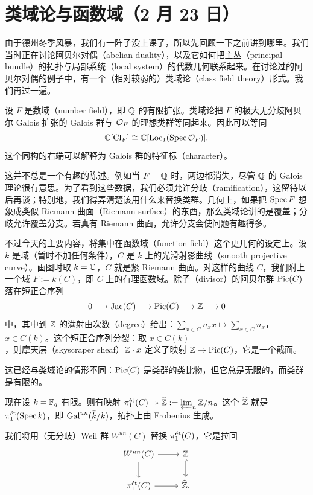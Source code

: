 \section[类域论与函数域]{类域论与函数域（2 月 23 日）}


由于德州冬季风暴，我们有一阵子没上课了，所以先回顾一下之前讲到哪里。我们当时正在讨论阿贝尔对偶（abelian duality），以及它如何把主丛（principal bundle）的拓扑与局部系统（local system）的代数几何联系起来。在讨论过的阿贝尔对偶的例子中，有一个（相对较弱的）类域论（class field theory）形式。我们再过一遍。

设 $F$ 是数域（number field），即 $\Q$ 的有限扩张。类域论把 $F$ 的极大无分歧阿贝尔 Galois 扩张的 Galois 群与 $\cO_F$ 的理想类群等同起来。因此可以等同
\[
  \C[\mathrm{Cl}_F] \cong \C[\mathrm{Loc}_1(\Spec \cO_F)].
\]
这个同构的右端可以解释为 Galois 群的特征标（character）。

这并不总是一个有趣的陈述。例如当 $F=\Q$ 时，两边都消失，尽管 $\Q$ 的 Galois 理论很有意思。为了看到这些数据，我们必须允许分歧（ramification），这留待以后再谈；特别地，我们得弄清楚该用什么来替换类群。几何上，如果把 $\Spec F$ 想象成类似 Riemann 曲面（Riemann surface）的东西，那么类域论讲的是覆盖；分歧允许覆盖分支。若真有 Riemann 曲面，允许分支会使问题有趣得多。

不过今天的主要内容，将集中在函数域（function field）这个更几何的设定上。设 $k$ 是域（暂时不加任何条件），$C$ 是 $k$ 上的光滑射影曲线（smooth projective curve）。画图时取 $k=\C$，$C$ 就是紧 Riemann 曲面。对这样的曲线 $C$，我们附上一个域 $F:=k(C)$，即 $C$ 上的有理函数域。除子（divisor）的阿贝尔群 $\Pic(C)$ 落在短正合序列
\[
  0 \longrightarrow \mathrm{Jac}(C) \longrightarrow \Pic(C) \longrightarrow \Z \longrightarrow 0
\]
中，其中到 $\Z$ 的满射由次数（degree）给出：$\sum_{x\in C} n_x x \mapsto \sum_{x\in C} n_x$，$x\in C(k)$。这个短正合序列分裂：取 $x\in C(k)$，则摩天层（skyscraper sheaf）$\Z\cdot x$ 定义了映射 $\Z\to\Pic(C)$，它是一个截面。

这已经与类域论的情形不同：$\Pic(C)$ 是类群的类比物，但它总是无限的，而类群是有限的。

现在设 $k=\F_q$ 有限。则有映射 $\pi_1^{\et}(C)\twoheadrightarrow \widehat{\Z}:=\varprojlim_n \Z/n$。这个 $\widehat{\Z}$ 就是 $\pi_1^{\et}(\Spec k)$，即 $\Gal^{un}(\bar{k}/k)$，拓扑上由 Frobenius 生成。

我们将用（无分歧）Weil 群 $W^{un}(C)$ 替换 $\pi_1^{\et}(C)$，它是拉回
\[
  \begin{tikzcd}
    W^{un}(C) \arrow[r] \arrow[d] & \Z \arrow[d, hook] \\
    \pi_1^{\et}(C) \arrow[r] & \widehat{\Z}.
  \end{tikzcd}
\]

